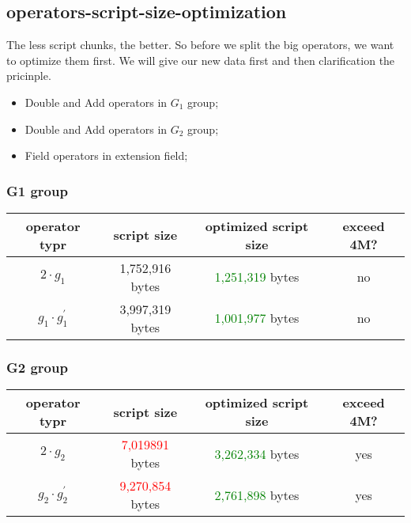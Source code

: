 \subsection{operators-script-size-optimization}

The less script chunks, the better. So before we split the big operators, we want to optimize them first. We will give our new
data first and then clarification the pricinple.

\begin{itemize}
    \item Double and Add operators in $G_1$ group;
    \item Double and Add operators in $G_2$ group;
    \item Field operators in extension field;
\end{itemize}

\subsubsection{G1 group}

\begin{center}
\begin{tabular}{|c|c|c|c|} \hline
operator typr & script size & optimized script size & exceed 4M? \\ \hline
$2 \cdot g_1$ & 1,752,916 bytes & \textcolor{green}{1,251,319} bytes & no  \\ \hline
$g_1 \cdot g_1^{'}$ & 3,997,319 bytes &	\textcolor{green}{1,001,977} bytes & no \\ \hline
\end{tabular}
\end{center}

\subsubsection{G2 group}

\begin{center}
\begin{tabular}{|c|c|c|c|} \hline
operator typr & script size & optimized script size & exceed 4M? \\ \hline
$2 \cdot g_2$ & \textcolor{red}{7,019891} bytes & \textcolor{green}{3,262,334} bytes & yes  \\ \hline
$g_2 \cdot g_2^{'}$ & \textcolor{red}{9,270,854} bytes & \textcolor{green}{2,761,898} bytes & yes \\ \hline
\end{tabular}
\end{center}

